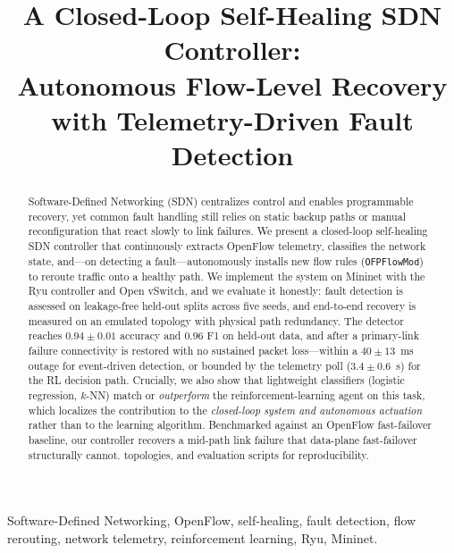 \documentclass[conference]{IEEEtran}
\begin{document}
\title{A Closed-Loop Self-Healing SDN Controller:\\
Autonomous Flow-Level Recovery with Telemetry-Driven Fault Detection}

\author{
}

\maketitle

\begin{abstract}
Software-Defined Networking (SDN) centralizes control and enables programmable
recovery, yet common fault handling still relies on static backup paths or manual
reconfiguration that react slowly to link failures. We present a closed-loop
self-healing SDN controller that continuously extracts OpenFlow telemetry,
classifies the network state, and---on detecting a fault---autonomously installs
new flow rules (\texttt{OFPFlowMod}) to reroute traffic onto a healthy path.
We implement the system on Mininet with the Ryu controller and Open vSwitch, and
we evaluate it honestly: fault detection is assessed on leakage-free held-out
splits across five seeds, and end-to-end recovery is measured on an emulated
topology with physical path redundancy. The detector reaches
$0.94\pm0.01$ accuracy and $0.96$ F1 %
on held-out data, and after a primary-link failure connectivity is restored with no
sustained packet loss---within a $40\pm13$~ms outage for event-driven detection,
or bounded by the telemetry poll ($3.4\pm0.6$~s) for the RL decision path.
Crucially, we also show that lightweight classifiers (logistic regression, $k$-NN)
match or \emph{outperform} the reinforcement-learning agent on this task, %
which localizes the contribution to the \emph{closed-loop system and autonomous
actuation} rather than to the learning algorithm. Benchmarked against an OpenFlow
fast-failover baseline, our controller recovers a mid-path link failure that
data-plane fast-failover structurally cannot. %
topologies, and evaluation scripts for reproducibility.
\end{abstract}

\begin{IEEEkeywords}
Software-Defined Networking, OpenFlow, self-healing, fault detection, flow
rerouting, network telemetry, reinforcement learning, Ryu, Mininet.
\end{IEEEkeywords}
\end{document}
